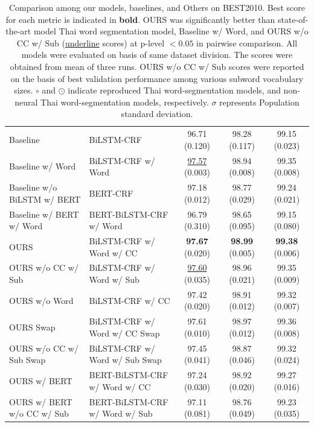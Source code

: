 \begin{table}
{\begin{tabular}{llccc}
Baseline                                 & BiLSTM-CRF                              & 96.71 (0.120)             & 98.28 (0.117)          & 99.15 (0.023)          \\
Baseline w/ Word                         & BiLSTM-CRF w/ Word                      & \underline{97.57} (0.003) & 98.94 (0.008)          & 99.35 (0.008)          \\ \hdashline
Baseline w/o BiLSTM w/ BERT              & BERT-CRF                                & 97.18 (0.012)             & 98.77 (0.029)          & 99.24 (0.021)          \\
Baseline w/ BERT w/ Word                 & BERT-BiLSTM-CRF w/ Word                 & 96.79 (0.310)             & 98.65 (0.095)          & 99.15 (0.080)          \\ \hline
OURS                                     & BiLSTM-CRF w/ Word w/ CC                & \textbf{97.67} (0.020)    & \textbf{98.99} (0.005) & \textbf{99.38} (0.006) \\
OURS w/o CC w/ Sub                       & BiLSTM-CRF w/ Word w/ Sub               & \underline{97.60} (0.035)             & 98.96 (0.021)          & 99.35 (0.009)          \\
OURS w/o Word                            & BiLSTM-CRF w/ CC                        & 97.42 (0.020)             & 98.91 (0.012)          & 99.32 (0.007)          \\
OURS Swap                                & BiLSTM-CRF w/ Word w/ CC Swap           & 97.61 (0.010)             & 98.97 (0.012)          & 99.36 (0.008)          \\
OURS w/o CC w/ Sub Swap                  & BiLSTM-CRF w/ Word w/ Sub Swap          & 97.45 (0.041)             & 98.87 (0.046)          & 99.32 (0.024)          \\ \hdashline
OURS w/ BERT                             & BERT-BiLSTM-CRF w/ Word w/ CC           & 97.24 (0.030)             & 98.92 (0.020)          & 99.27 (0.016)          \\
OURS w/ BERT w/o CC w/ Sub               & BERT-BiLSTM-CRF w/ Word w/ Sub          & 97.11 (0.081)             & 98.76 (0.049)          & 99.23 (0.035)          \\ \hline
\end{tabular}}
\caption{Comparison among our models, baselines, and Others on BEST2010. Best score for each metric is indicated in \textbf{bold}. OURS was significantly better than state-of-the-art model Thai word segmentation model, Baseline w/ Word, and OURS w/o CC w/ Sub (\underline{underline} scores) at p-level $< 0.05$ in pairwise comparison. All models were evaluated on basis of same dataset division. The scores were obtained from mean of three runs. OURS w/o CC w/ Sub scores were reported on the basis of best validation performance among various subword vocabulary sizes. $\circ$ and $\odot$ indicate reproduced Thai word-segmentation models, and non-neural Thai word-segmentation models, respectively. $\sigma$ represents Population standard deviation.}
\label{tab:main-results}
\end{table}

